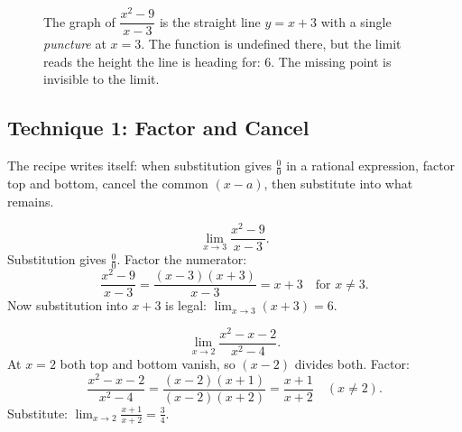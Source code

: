 \begin{figure}[h]
\centering
{}
\caption{The graph of $\dfrac{x^{2}-9}{x-3}$ is the straight line $y=x+3$ with
a single \emph{puncture} at $x=3$. The function is undefined there, but the
limit reads the height the line is heading for: $6$. The missing point is
invisible to the limit.}
\label{ch07:fig-hole}
\end{figure}

\subsection{Technique 1: Factor and Cancel}
\label{ch07:factor}

The recipe writes itself: when substitution gives $\frac00$ in a rational
expression, factor top and bottom, cancel the common $(x-a)$, then substitute
into what remains.

\begin{example}
\label{ch07:ex-factor1}
\[
  \lim_{x\to 3} \frac{x^{2}-9}{x-3}.
\]
Substitution gives $\frac{0}{0}$. Factor the numerator:
\[
  \frac{x^{2}-9}{x-3} = \frac{(x-3)(x+3)}{x-3} = x+3
  \quad\text{for } x\neq 3.
\]
Now substitution into $x+3$ is legal: $\displaystyle\lim_{x\to 3}(x+3) = 6.$
\end{example}

\begin{example}
\label{ch07:ex-factor2}
\[
  \lim_{x\to 2} \frac{x^{2}-x-2}{x^{2}-4}.
\]
At $x=2$ both top and bottom vanish, so $(x-2)$ divides both. Factor:
\[
  \frac{x^{2}-x-2}{x^{2}-4}
  = \frac{(x-2)(x+1)}{(x-2)(x+2)}
  = \frac{x+1}{x+2}
  \quad (x\neq 2).
\]
Substitute: $\displaystyle \lim_{x\to 2}\frac{x+1}{x+2} = \frac{3}{4}.$
\end{example}

